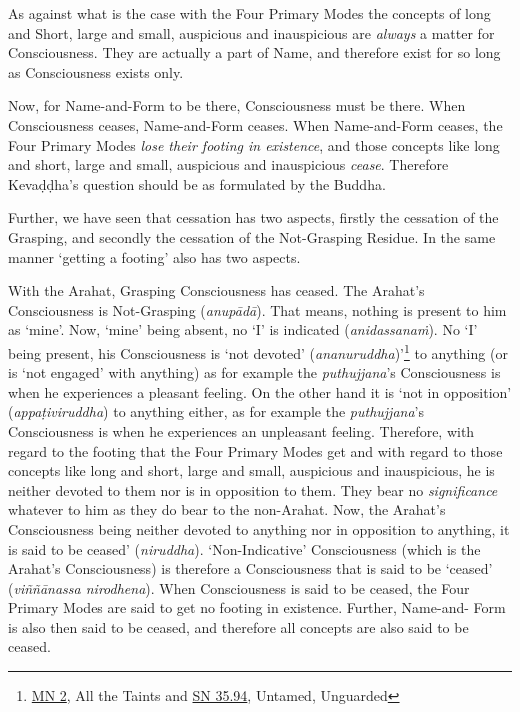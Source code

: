 As against what is the case with the Four Primary Modes the concepts of long and Short, large and small, auspicious and inauspicious are \emph{always} a matter for Consciousness. They are actually a part of Name, and therefore exist for so long as Consciousness exists only.

Now, for Name-and-Form to be there, Consciousness must be there. When Consciousness ceases, Name-and-Form ceases. When Name-and-Form ceases, the Four Primary Modes \emph{lose their footing in existence}, and those concepts like long and short, large and small, auspicious and inauspicious \emph{cease}. Therefore Kevaḍḍha's question should be as formulated by the Buddha.

Further, we have seen that cessation has two aspects, firstly the cessation of the Grasping, and secondly the cessation of the Not-Grasping Residue. In the same manner `getting a footing' also has two aspects.

With the Arahat, Grasping Consciousness has ceased. The Arahat's Consciousness is Not-Grasping (\textit{anupādā}). That means, nothing is present to him as `mine'. Now, `mine' being absent, no `I' is indicated (\textit{anidassanaṁ}). No `I' being present, his Consciousness is `not devoted' (\textit{ananuruddha})'\footnote{\href{https://suttacentral.net/mn2/en/bodhi}{MN 2}, All the Taints and \href{https://suttacentral.net/sn35.94/en/bodhi}{SN 35.94}, Untamed, Unguarded} to anything (or is `not engaged' with anything) as for example the \textit{puthujjana}'s Consciousness is when he experiences a pleasant feeling. On the other hand it is `not in opposition' (\textit{appaṭiviruddha}) to anything either, as for example the \textit{puthujjana}'s Consciousness is when he experiences an unpleasant feeling. Therefore, with regard to the footing that the Four Primary Modes get and with regard to those concepts like long and short, large and small, auspicious and inauspicious, he is neither devoted to them nor is in opposition to them. They bear no \emph{significance} whatever to him as they do bear to the non-Arahat. Now, the Arahat's Consciousness being neither devoted to anything nor in opposition to anything, it is said to be ceased' (\textit{niruddha}). `Non-Indicative' Consciousness (which is the Arahat's Consciousness) is therefore a Consciousness that is said to be `ceased' (\textit{viññānassa nirodhena}). When Consciousness is said to be ceased, the Four Primary Modes are said to get no footing in existence. Further, Name-and- Form is also then said to be ceased, and therefore all concepts are also said to be ceased.

